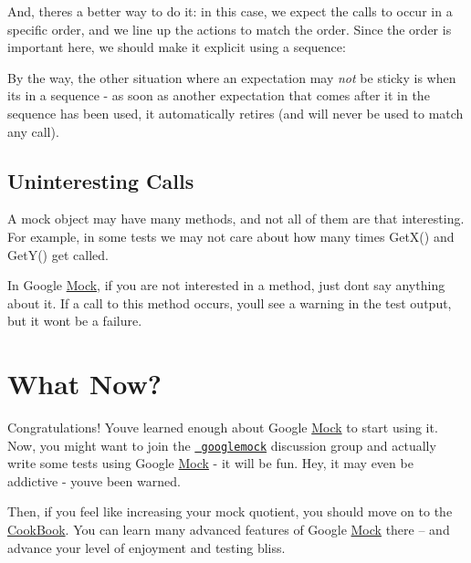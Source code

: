 And, there\textquotesingle{}s a better way to do it\+: in this case, we expect the calls to occur in a specific order, and we line up the actions to match the order. Since the order is important here, we should make it explicit using a sequence\+:


\begin{DoxyCode}{0}
\DoxyCodeLine{\{}
\DoxyCodeLine{}
\DoxyCodeLine{  \}}
\DoxyCodeLine{\}}
\end{DoxyCode}


By the way, the other situation where an expectation may {\itshape not} be sticky is when it\textquotesingle{}s in a sequence -\/ as soon as another expectation that comes after it in the sequence has been used, it automatically retires (and will never be used to match any call).

\subsection*{Uninteresting Calls}

A mock object may have many methods, and not all of them are that interesting. For example, in some tests we may not care about how many times {\ttfamily Get\+X()} and {\ttfamily Get\+Y()} get called.

In Google \mbox{\hyperlink{class_mock}{Mock}}, if you are not interested in a method, just don\textquotesingle{}t say anything about it. If a call to this method occurs, you\textquotesingle{}ll see a warning in the test output, but it won\textquotesingle{}t be a failure.

\section*{What Now?}

Congratulations! You\textquotesingle{}ve learned enough about Google \mbox{\hyperlink{class_mock}{Mock}} to start using it. Now, you might want to join the \href{http://groups.google.com/group/googlemock}{\texttt{ googlemock}} discussion group and actually write some tests using Google \mbox{\hyperlink{class_mock}{Mock}} -\/ it will be fun. Hey, it may even be addictive -\/ you\textquotesingle{}ve been warned.

Then, if you feel like increasing your mock quotient, you should move on to the \mbox{\hyperlink{_obj__test_2lib_2googletest-release-1_88_81_2googlemock_2docs_2_cook_book_8md}{Cook\+Book}}. You can learn many advanced features of Google \mbox{\hyperlink{class_mock}{Mock}} there -- and advance your level of enjoyment and testing bliss. 